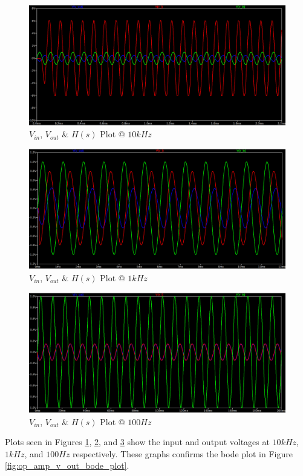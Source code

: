 \newpage
\thispagestyle{plain}

\begin{figure}[h]
    \centering
    \includegraphics[width=1\textwidth]{assets/opamp-10k.png}
    \caption{$V_{in}$, $V_{out}$ \& $H(s)$ Plot @ $10kHz$}
    \label{fig:op_amp_out_10k}
\end{figure}

\begin{figure}[h]
    \centering
    \includegraphics[width=1\textwidth]{assets/opamp-1k.png}
    \caption{$V_{in}$, $V_{out}$ \& $H(s)$ Plot @ $1kHz$}
    \label{fig:op_amp_out_1k}
\end{figure}

\newpage
\thispagestyle{plain}

\begin{figure}[h]
    \centering
    \includegraphics[width=1\textwidth]{assets/opamp-100.png}
    \caption{$V_{in}$, $V_{out}$ \& $H(s)$ Plot @ $100Hz$}
    \label{fig:op_amp_out_100}
\end{figure}

Plots seen in Figures \ref{fig:op_amp_out_10k}, \ref{fig:op_amp_out_1k}, and \ref{fig:op_amp_out_100} show the input and output voltages at $10kHz$, $1kHz$, and $100Hz$ respectively. These graphs confirms the bode plot in Figure \ref{fig:op_amp_v_out_bode_plot}.
